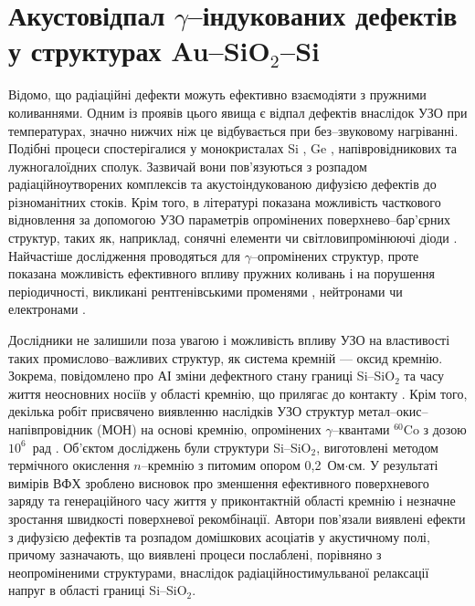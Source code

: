 \section{Акустовідпал $\gamma$--індукованих дефектів у структурах Au--SiO$_2$--Si}

Відомо, що радіаційні дефекти можуть ефективно взаємодіяти з пружними коливаннями.
Одним із проявів цього явища є відпал дефектів внаслідок УЗО при температурах, значно нижчих ніж це відбувається при без--звуковому нагріванні.
Подібні процеси спостерігалися у монокристалах Si \cite{OstrovRadSi,Podolian2012r,PodolHivr,YOlikh2006TPLr}, Ge \cite{Olikh:FTP1996},
напівровідникових \cite{OlikhProc,OstrovFTTRad} та лужногалоїдних \cite{UST:OstrovCsI} сполук.
Зазвичай вони пов'язуються з розпадом радіаційноутворених комплексів та акустоіндукованою дифузією дефектів до різноманітних стоків.
Крім того, в літературі показана можливість часткового відновлення за допомогою УЗО параметрів опромінених поверхнево--бар'єрних структур, таких як, наприклад,
сонячні елементи \cite{YOlikh2007TPLr} чи світловипромінюючі діоди \cite{US:LED,UST:LED_SM}.
Найчастіше дослідження проводяться для $\gamma$--опромінених структур, проте показана можливість ефективного впливу пружних коливань і на порушення періодичності, викликані
рентгенівськими променями \cite{UST:OstrovCsI}, нейтронами \cite{Olikh:FTP1996} чи електронами \cite{US:LED,UST:LED_SM}.

   Дослідники не залишили поза увагою і можливість впливу УЗО на властивості таких промислово--важливих структур, як система
кремній --- оксид кремнію.
Зокрема, повідомлено про АІ зміни дефектного стану границі  Si--SiO$_2$ \cite{Ostap:SiO2,UST:Medvid,Zaver:2008r} та часу життя неосновних носіїв у області кремнію,
що прилягає до контакту \cite{Parchinskii2003r,Zdeb1989}.
Крім того, декілька робіт присвячено виявленню наслідків УЗО структур метал--окис--напівпровідник (МОН) на основі кремнію, опромінених $\gamma$--квантами $^{60}$Co з дозою $10^6$~рад \cite{Parchinskii2000r,Parchinskii2006r}.
Об'єктом досліджень були структури Si--SiO$_2$, виготовлені методом термічного окислення $n$--кремнію з питомим опором 0,2~Ом$\cdot$см.
У результаті вимірів ВФХ зроблено висновок про зменшення ефективного поверхневого заряду та генераційного часу життя у приконтактній області кремнію і незначне
зростання швидкості поверхневої рекомбінації.
Автори пов'язали виявлені ефекти з дифузією дефектів та розпадом домішкових асоціатів у акустичному полі, причому зазначають, що виявлені процеси
послаблені, порівняно з неопроміненими структурами, внаслідок радіаційностимульваної релаксації напруг в області границі Si--SiO$_2$.

